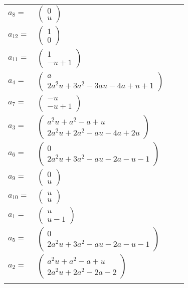 \documentclass[1p]{elsarticle_modified}
\theoremstyle{definition}
\begin{document}
\begin{tabular}{m{7pt} m{180pt} m{7pt} m{180pt} }
\flushright $a_{8}=$&$\begin{pmatrix}0\\u\end{pmatrix}$ \\
\flushright $a_{12}=$&$\begin{pmatrix}1\\0\end{pmatrix}$ \\
\flushright $a_{11}=$&$\begin{pmatrix}1\\- u+1\end{pmatrix}$ \\
\flushright $a_{4}=$&$\begin{pmatrix}a\\2 a^2 u+3 a^2-3 a u-4 a+u+1\end{pmatrix}$ \\
\flushright $a_{7}=$&$\begin{pmatrix}- u\\- u+1\end{pmatrix}$ \\
\flushright $a_{3}=$&$\begin{pmatrix}a^2 u+a^2- a+u\\2 a^2 u+2 a^2- a u-4 a+2 u\end{pmatrix}$ \\
\flushright $a_{6}=$&$\begin{pmatrix}0\\2 a^2 u+3 a^2- a u-2 a- u-1\end{pmatrix}$ \\
\flushright $a_{9}=$&$\begin{pmatrix}0\\u\end{pmatrix}$ \\
\flushright $a_{10}=$&$\begin{pmatrix}u\\u\end{pmatrix}$ \\
\flushright $a_{1}=$&$\begin{pmatrix}u\\u-1\end{pmatrix}$ \\
\flushright $a_{5}=$&$\begin{pmatrix}0\\2 a^2 u+3 a^2- a u-2 a- u-1\end{pmatrix}$ \\
\flushright $a_{2}=$&$\begin{pmatrix}a^2 u+a^2- a+u\\2 a^2 u+2 a^2-2 a-2\end{pmatrix}$\\&\end{tabular}
\end{document}
